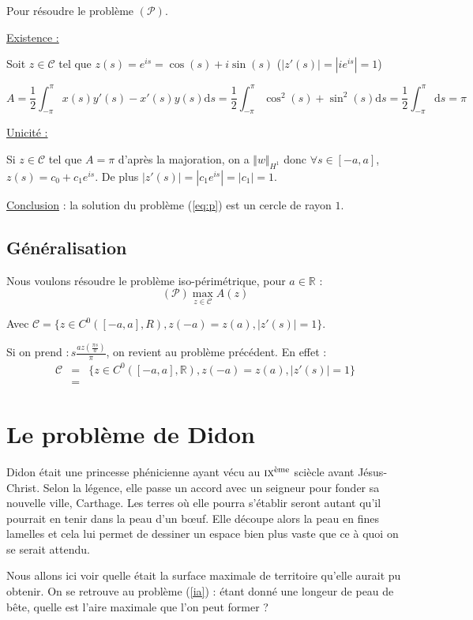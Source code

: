 \documentclass[10pt,a4paper]{article}
\newcommand{\R}{\mathbb{R}}
\renewcommand{\d}{\mathrm{d}}
\theoremstyle{plain}
\theoremstyle{definition}
\begin{document}
Pour résoudre le problème $(\mathcal{P})$.

\underline{Existence :}

Soit $z \in \mathcal{C}$ tel que $z(s)=e^{is} = \cos(s)+i\sin(s)$ ($|z'(s)|=|ie^{is}|=1$)

\[ A = \frac{1}{2} \int_{-\pi}^{\pi}{ x(s)y'(s) - x'(s)y(s) \d s } = \frac{1}{2} \int_{-\pi}^{\pi}{ \cos^2(s) + \sin^2(s) \d s } = \frac{1}{2} \int_{-\pi}^{\pi}{ \d s } = \pi \]

\underline{Unicité :}

Si $z \in \mathcal{C}$ tel que $A=\pi$ d'après la majoration, on a $\Vert w\Vert_{H^1}$ donc $\forall s\in [-a,a]$, $z(s) = c_0+c_1e^{is}$. De plus $|z'(s)|=|c_1e^{is}| = |c_1| = 1$.


\underline{Conclusion} : la solution du problème (\ref{eq:p}) est un cercle de rayon $1$. 

\subsection{Généralisation}

Nous voulons résoudre le problème iso-périmétrique, pour $a\in \R$ :
\[ (\mathcal{P}) \max_{z \in \mathcal{C}} A(z) \]

Avec $\mathcal{C} = \{ z \in C^0([-a,a], R), z(-a)=z(a), |z'(s)|=1 \}$.

Si on prend $ : s\frac{a z(\frac{\pi s}{a})}{\pi}$, on revient au problème précédent. En effet :
\begin{eqnarray}
\mathcal{C} &=& \{ z \in C^0([-a,a], \R), z(-a)=z(a), |z'(s)|=1 \} \\
&=& 
\end{eqnarray}

\section{Le problème de Didon}
\label{sec:didon}


Didon était une princesse phénicienne ayant vécu au $\textsc{ix}^\text{ème}$ sciècle avant Jésus-Christ. Selon la légence, elle passe un accord avec un seigneur pour fonder sa nouvelle ville, Carthage. Les terres où elle pourra s'établir seront \og autant qu'il pourrait en tenir dans la peau d'un b\oe{}uf\fg{}. Elle découpe alors la peau en fines lamelles et cela lui permet de dessiner un espace bien plus vaste que ce à quoi on se serait attendu.

Nous allons ici voir quelle était la surface maximale de territoire qu'elle aurait pu obtenir. On se retrouve au problème (\ref{ia}) : étant donné une longeur de peau de bête, quelle est l'aire maximale que l'on peut former ?
\end{document}

